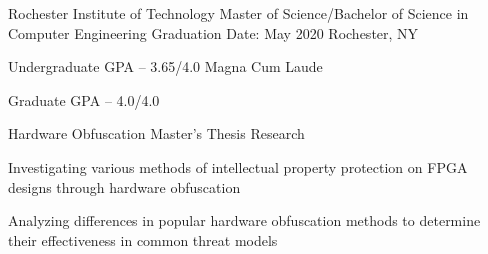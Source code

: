 
\begin{cventries}
  \cvexperience
	{Rochester Institute of Technology}
	{Master of Science/Bachelor of Science in Computer Engineering}
    {Graduation Date: May 2020}
    {Rochester, NY}
    {
      \begin{cvitems}
	  \item {Undergraduate GPA -- 3.65/4.0 Magna Cum Laude}
	  \item {Graduate GPA -- 4.0/4.0}
      \end{cvitems}
    }

  \cvexperience
  {Hardware Obfuscation}
	{Master's Thesis Research}
    {}
    {}
    {
		\begin{cvitems}
		\item Investigating various methods of intellectual property protection on FPGA designs through hardware obfuscation
		\item Analyzing differences in popular hardware obfuscation methods to determine their effectiveness in common threat models
		\end{cvitems}
    }

\end{cventries}
